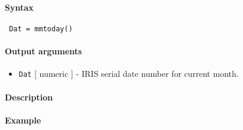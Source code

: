 


	\paragraph{Syntax}
 
 \begin{verbatim}
 Dat = mmtoday()
 \end{verbatim}
 
 \paragraph{Output arguments}
 
 \begin{itemize}
 \item
   \texttt{Dat} {[} numeric {]} - IRIS serial date number for current
   month.
 \end{itemize}
 
 \paragraph{Description}
 
 \paragraph{Example}


